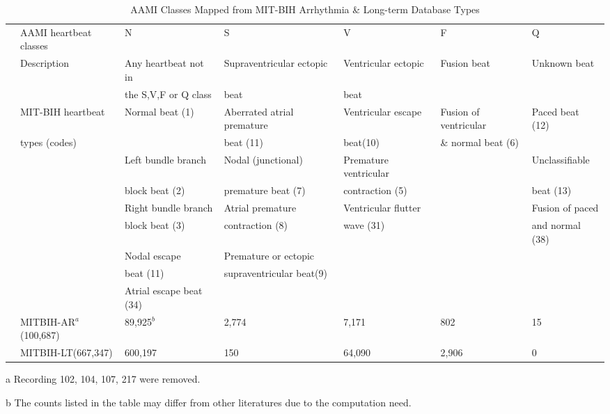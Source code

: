\documentclass[journal]{IEEEtran}
\begin{document}
\begin{table}[!htbp]
\begin{center}
\begin{threeparttable}
\caption{AAMI Classes Mapped from MIT-BIH Arrhythmia \& Long-term Database Types}
\label{Table1}
\begin{tabular}{cllllll}
\hline
& AAMI heartbeat classes & N & S & V & F & Q \\
& Description  &Any heartbeat not in & Supraventricular ectopic  & Ventricular ectopic  & Fusion beat & Unknown beat \\
&                     &the S,V,F or Q class & beat   		     & beat	      &	     &          \\
\hline
& MIT-BIH heartbeat  &Normal beat (1)            & Aberrated atrial premature & Ventricular escape & Fusion of ventricular& Paced beat (12)\\
&  types (codes)   &  					  &  beat (11)		    &  beat(10)	            & \& normal beat (6)		      &             \\

&                     &Left bundle branch   &  Nodal (junctional) &Premature ventricular& 	 &  Unclassifiable \\
&                     &block beat (2)            & premature beat (7)    &contraction (5)         &	   & beat (13)   \\

&                     & Right bundle branch & Atrial premature & Ventricular flutter &    &  Fusion of paced  \\
&                     & block beat (3) & contraction (8)     & wave (31) & 	   & and normal (38)  \\

&                     & Nodal escape  & Premature or ectopic & 	     &  &                          \\
&                     & beat (11)	  & supraventricular beat(9) &     &   &     \\

&                     & Atrial escape beat (34)   &  	  				      & 				            & 			      &                          \\
\hline
& MITBIH-AR$^a$(100,687) & 89,925$^b$   & 2,774   & 7,171   & 802    & 15        \\
& MITBIH-LT(667,347) & 600,197  &  150  & 64,090  & 	2,906   & 0       \\

\hline
\end{tabular}
\begin{tablenotes}
\item [a] Recording 102, 104, 107, 217 were removed.
\item [b] The counts listed in the table may differ from other literatures \cite{chaza} due to the computation need.
\end{tablenotes}
\end{threeparttable}

\end{center}
     \end{table}
\end{document}

